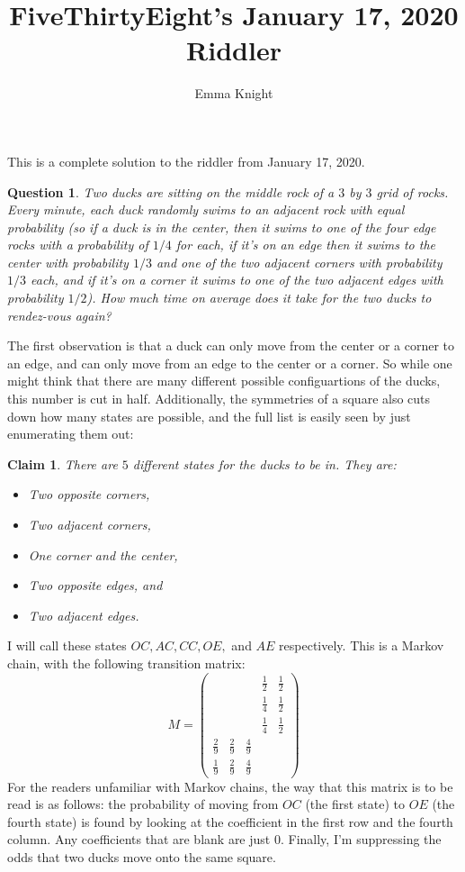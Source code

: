 \documentclass[11pt]{article}
\title{FiveThirtyEight's January 17, 2020 Riddler}
\author{Emma Knight}
\newtheorem{claim}[theorem]{Claim}
\newtheorem{question}[theorem]{Question}
\theoremstyle{definition}
\begin{document}
\maketitle

This is a complete solution to the riddler from January 17, 2020.

\begin{question}
Two ducks are sitting on the middle rock of a $3$ by $3$ grid of rocks.  Every minute, each duck randomly swims to an adjacent rock with equal probability (so if a duck is in the center, then it swims to one of the four edge rocks with a probability of $1/4$ for each, if it's on an edge then it swims to the center with probability $1/3$ and one of the two adjacent corners with probability $1/3$ each, and if it's on a corner it swims to one of the two adjacent edges with probability $1/2$).  How much time on average does it take for the two ducks to rendez-vous again?
\end{question}

The first observation is that a duck can only move from the center or a corner to an edge, and can only move from an edge to the center or a corner.  So while one might think that there are many different possible configuartions of the ducks, this number is cut in half.  Additionally, the symmetries of a square also cuts down how many states are possible, and the full list is easily seen by just enumerating them out:
\begin{claim}
There are $5$ different states for the ducks to be in.  They are:
\begin{itemize}
\item Two opposite corners,
\item Two adjacent corners,
\item One corner and the center,
\item Two opposite edges, and
\item Two adjacent edges.
\end{itemize}
\end{claim}

I will call these states $OC, AC, CC, OE,$ and $AE$ respectively.  This is a Markov chain, with the following transition matrix:
$$M = \left(\begin{matrix}  &  &  & \frac{1}{2} & \frac{1}{2} \\  &  &  & \frac{1}{4} & \frac{1}{2} \\  &  &  & \frac{1}{4} & \frac{1}{2} \\ \frac{2}{9} & \frac{2}{9} & \frac{4}{9} &  &  \\ \frac{1}{9} & \frac{2}{9} & \frac{4}{9} &  &  \end{matrix}\right)$$
For the readers unfamiliar with Markov chains, the way that this matrix is to be read is as follows: the probability of moving from $OC$ (the first state) to $OE$ (the fourth state) is found by looking at the coefficient in the first row and the fourth column.  Any coefficients that are blank are just $0$.  Finally, I'm suppressing the odds that two ducks move onto the same square.
\end{document}
